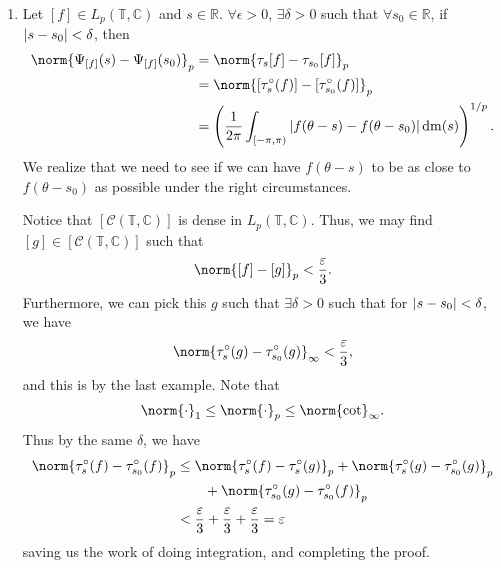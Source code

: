 \documentclass[notoc,notitlepage]{tufte-book}
\DeclareMathOperator{\dm}{dm}
\begin{document}
\begin{eg}
\begin{enumerate}
    \item Let $[f] \in L_p(\mathbb{T}, \mathbb{C})$ and $s \in \mathbb{R}$.
      \WTS $\forall \epsilon > 0$, $\exists \delta > 0$
      such that $\forall s_0 \in \mathbb{R}$,
      if $\left|s - s_0\right| < \delta$, then
      \begin{align*}
        \norm{\Psi_{[f]}(s) - \Psi_{[f]}(s_0)}_p
        &= \norm{\tau_s[f] - \tau_{s_0}[f]}_p \\
        &= \norm{[\tau_s^{\circ}(f)] - [\tau_{s_0}^{\circ}(f)]}_p \\
        &= \left( \frac{1}{2\pi} \int_{[-\pi, \pi)}
          \abs{f(\theta - s) - f(\theta - s_0)} \dm(s) \right)^{1 / p}.
      \end{align*}
      We realize that we need to see if we can have $f(\theta - s)$
      to be as close to $f(\theta - s_0)$ as possible under
      the right circumstances.

      Notice that $[\mathcal{C}(\mathbb{T}, \mathbb{C})]$ is dense in
      $L_p(\mathbb{T}, \mathbb{C})$. Thus, we may find
      $[g] \in [\mathcal{C}(\mathbb{T}, \mathbb{C})]$ such that
      \begin{equation*}
        \norm{[f] - [g]}_p < \frac{\epsilon}{3}.
      \end{equation*}
      Furthermore, we can pick this $g$ such that $\exists \delta > 0$
      such that for $\left|s - s_0\right| < \delta$, we have
      \begin{equation*}
        \norm{\tau_s^{\circ}(g) - \tau_{s_0}^{\circ}(g)}_\infty < \frac{\epsilon}{3},
      \end{equation*}
      and this is by the last example.
      Note that
      \begin{equation*}
        \norm{\cdot}_1 \leq \norm{\cdot}_p \leq \norm{\cot}_\infty.
      \end{equation*}
      Thus by the same $\delta$, we have
      \begin{align*}
        \norm{\tau_s^{\circ}(f) - \tau_{s_0}^{\circ}(f)}_p
        &\leq \norm{\tau_s^{\circ}(f) - \tau_s^{\circ}(g)}_p
         + \norm{\tau_s^{\circ}(g) - \tau_{s_0}^{\circ}(g)}_p \\
        &\qquad+ \norm{\tau_{s_0}^{\circ}(g) - \tau_{s_0}^{\circ}(f)}_p \\
        &< \frac{\epsilon}{3} + \frac{\epsilon}{3} + \frac{\epsilon}{3}
         = \epsilon
      \end{align*}
      saving us the work of doing integration, and completing the proof.
  \end{enumerate}
\end{eg}
\end{document}

